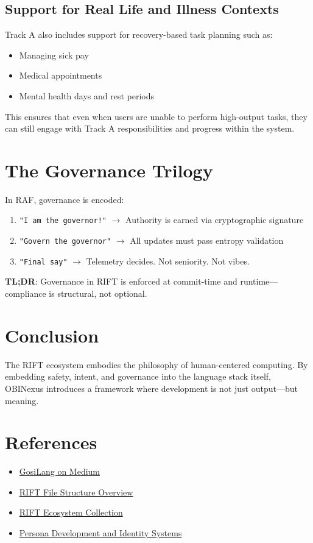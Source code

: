 \documentclass{article}
\begin{document}
\subsection{Support for Real Life and Illness Contexts}
Track A also includes support for recovery-based task planning such as:
\begin{itemize}
    \item Managing sick pay
    \item Medical appointments
    \item Mental health days and rest periods
\end{itemize}
This ensures that even when users are unable to perform high-output tasks, they can still engage with Track A responsibilities and progress within the system.

\section{The Governance Trilogy}
In RAF, governance is encoded:
\begin{enumerate}
    \item \texttt{"I am the governor!"} $\rightarrow$ Authority is earned via cryptographic signature
    \item \texttt{"Govern the governor"} $\rightarrow$ All updates must pass entropy validation
    \item \texttt{"Final say"} $\rightarrow$ Telemetry decides. Not seniority. Not vibes.
\end{enumerate}
\textbf{TL;DR}: Governance in RIFT is enforced at commit-time and runtime—compliance is structural, not optional.

\section{Conclusion}
The RIFT ecosystem embodies the philosophy of human-centered computing. By embedding safety, intent, and governance into the language stack itself, OBINexus introduces a framework where development is not just output—but meaning.

\section*{References}
\begin{itemize}
    \item \href{https://obinexus.medium.com/gosilang-the-gossip-programming-language-2ffda013889f}{GosiLang on Medium}
    \item \href{https://obinexus.medium.com/so-what-are-rift-files-1fa97cdc7bf0}{RIFT File Structure Overview}
    \item \href{https://obinexus.medium.com/list/the-rift-ecosystem-33dd7dd0dc0e}{RIFT Ecosystem Collection}
    \item \href{https://obinexus.medium.com/the-link-between-personality-disorder-and-persona-development-cc722bea8e86}{Persona Development and Identity Systems}
\end{itemize}
\end{document}

